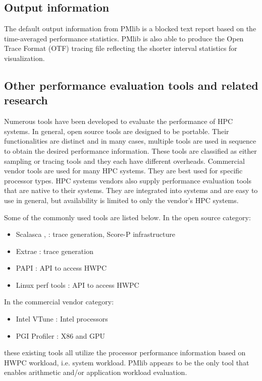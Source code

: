 \documentclass[conference]{IEEEtran}
\begin{document}
\subsection{Output information}
\label{subsection:PMlib-output-information}
The default output information from PMlib is a blocked text report based on
the time-averaged performance statistics.
PMlib is also able to produce the Open Trace Format (OTF) tracing file
reflecting the shorter interval statistics for visualization.
%

\subsection{Other performance evaluation tools and related research}
\label{subsection:related-research}
Numerous tools have been developed to evaluate the performance of HPC systems.
In general, open source tools are designed to be portable.
Their functionalities are distinct and in many cases, multiple tools
are used in sequence to obtain the desired performance information.
These tools are classified as either sampling or tracing tools and they each have different overheads.
Commercial vendor tools are used for many HPC systems.
They are best used for specific processor types.
HPC systems vendors also supply performance evaluation tools
that are native to their systems.
They are integrated into systems and are easy to use in general,
but availability is limited to only the vendor's HPC systems.

Some of the commonly used tools are listed below.
In the open source category:
\begin{itemize}
	\item Scalasca \cite{Scalasca:2017},\cite{Scalasca:2010}
			: trace generation, Score-P infrastructure
	\item Extrae \cite{Extrae:webpage} :  trace generation
	\item PAPI \cite{PAPI:5.6} : API to access HWPC
	\item Linux perf tools : API to access HWPC
\end{itemize}
In the commercial vendor category:
\begin{itemize}
		\item Intel VTune \cite{Intel:VTune} : Intel processors
		\item PGI Profiler \cite{PGI:Profiler} : X86 and GPU
\end{itemize}
these existing tools all utilize the processor performance information
based on HWPC workload, i.e. system workload.
PMlib appears to be the only tool that enables arithmetic and/or application
workload evaluation.
\end{document}
